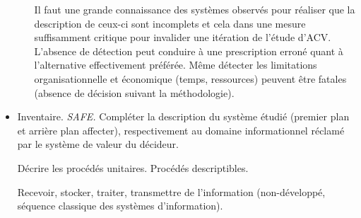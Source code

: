 \begin{itemize}
\begin{itemize}
Il faut une grande connaissance des systèmes observés pour réaliser que la description de ceux-ci sont incomplets et cela dans une mesure suffisamment critique pour invalider une itération de l'étude d'ACV.
L'absence de détection peut conduire à une prescription erroné quant à l'alternative effectivement préférée.
Même détecter les limitations organisationnelle et économique (temps, ressources) peuvent être fatales (absence de décision suivant la méthodologie).

\end{itemize}
\item Inventaire.
\textit{SAFE.}
Compléter la description du système étudié (premier plan et arrière plan affecter), respectivement au domaine informationnel réclamé par le système de valeur du décideur.

Décrire les procédés unitaires.
Procédés descriptibles.

Recevoir, stocker, traiter, transmettre de l'information (non-développé, séquence classique des systèmes d'information).


\end{itemize}
